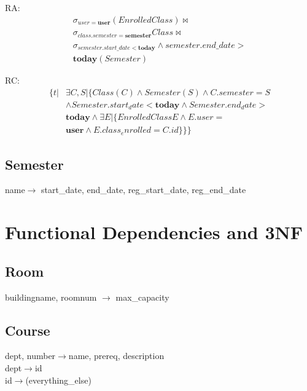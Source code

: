 \documentclass[11pt,oneside,a4paper]{article}
\begin{document}
RA:
\begin{align*}
\sigma_{user = \textbf{user}}(EnrolledClass) \bowtie \\
\sigma_{class.semester = \textbf{semester}} Class \bowtie \\
\sigma_{semester.start\_date < \textbf{today}} \wedge semester.end\_date > \\
\textbf{today}(Semester) \end{align*}

RC:
\begin{align*}
\{t | & \exists C,S | \{Class(C) \wedge Semester(S) \wedge C.semester = S \\
& \wedge Semester.start_date < \textbf{today} \wedge Semester.end_date > \\
& \textbf{today} \wedge \exists E | \{EnrolledClass E \wedge E.user = \\
&  \textbf{user} \wedge E.class_enrolled = C.id\}\}\}
\end{align*}
\subsection{Semester}
\hspace{0.5in}name$\rightarrow$ start\_date, end\_date, reg\_start\_date, reg\_end\_date  
\section{Functional Dependencies and 3NF}

\subsection{Room}
\hspace*{0.5in}buildingname, roomnum $\rightarrow$ max\_capacity


\subsection{Course}
\hspace*{0.5in}dept, number$\rightarrow$name, prereq, description \\
\hspace*{0.5in}dept$\rightarrow$id \\
\hspace*{0.5in}id$\rightarrow$(everything\_else) 
\end{document}
